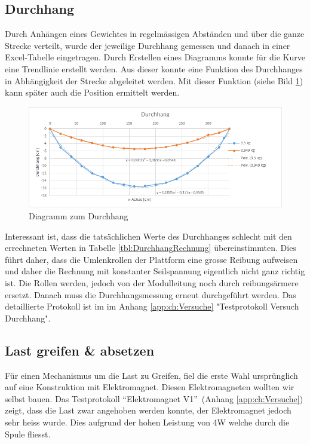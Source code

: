 \documentclass[a4paper]{report}
\begin{document}
\subsection{Durchhang}
\label{ssec:VersDurch}
Durch Anhängen eines Gewichtes in regelmässigen Abständen und über die ganze Strecke verteilt, wurde der jeweilige Durchhang gemessen und danach in einer Excel-Tabelle eingetragen. Durch Erstellen eines Diagramms konnte für die Kurve eine Trendlinie erstellt werden. Aus dieser konnte eine Funktion des Durchhanges in Abhängigkeit der Strecke abgeleitet werden. Mit dieser Funktion (siehe Bild \ref{fig:Durchhang_v1}) kann später auch die Position ermittelt werden.
\begin{figure}[h!]
	\centering
	\includegraphics[width=\textwidth,keepaspectratio]{Durchhang_v1}
	\caption{Diagramm zum Durchhang}
	\label{fig:Durchhang_v1}
\end{figure}

Interessant ist, dass die tatsächlichen Werte des Durchhanges schlecht mit den errechneten Werten in Tabelle \ref{tbl:DurchhangRechnung} übereinstimmten. Dies führt daher, dass die Umlenkrollen der Plattform eine grosse Reibung aufweisen und daher die Rechnung mit konstanter Seilspannung eigentlich nicht ganz richtig ist. Die Rollen werden, jedoch von der Modulleitung noch durch reibungsärmere ersetzt. Danach muss die Durchhangsmessung erneut durchgeführt werden. Das detaillierte Protokoll ist im im Anhang \ref{app:ch:Versuche} "Testprotokoll Versuch Durchhang".

\subsection{Last greifen \& absetzen}
\label{ssec:VersLastg}

Für einen Mechanismus um die Last zu Greifen, fiel die erste Wahl ursprünglich auf eine Konstruktion mit Elektromagnet. Diesen Elektromagneten wollten wir selbst bauen. Das Testprotokoll \textquotedblleft Elektromagnet V1\textquotedblright\ (Anhang \ref{app:ch:Versuche}) zeigt, dass die Last zwar angehoben werden konnte, der Elektromagnet jedoch sehr heiss wurde. Dies aufgrund der hohen Leistung von 4W welche durch die Spule fliesst.
\end{document}
